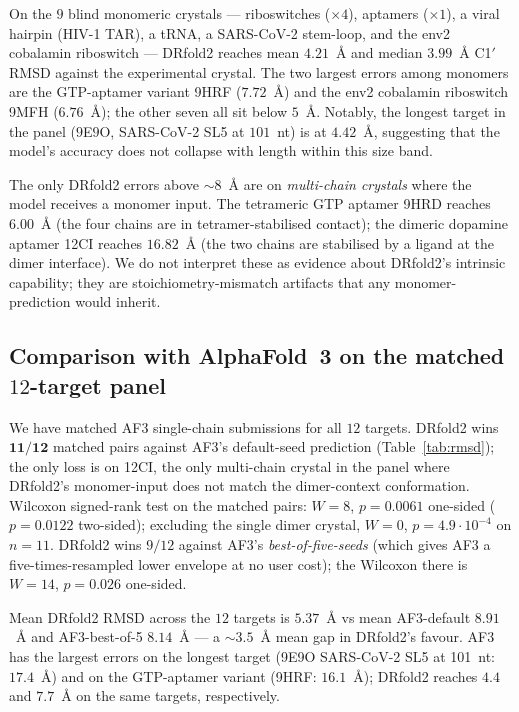 \documentclass[11pt,a4paper]{article}
\begin{document}
On the $9$ blind monomeric crystals --- riboswitches ($\times 4$),
aptamers ($\times 1$), a viral hairpin (HIV-1 TAR), a tRNA, a
SARS-CoV-2 stem-loop, and the env2 cobalamin riboswitch ---
DRfold2 reaches mean $4.21$~\AA{} and median $3.99$~\AA{} C1$'$ RMSD
against the experimental crystal. The two largest errors among
monomers are the GTP-aptamer variant 9HRF ($7.72$~\AA{}) and the
env2 cobalamin riboswitch 9MFH ($6.76$~\AA{}); the other seven all
sit below $5$~\AA{}. Notably, the longest target in the panel
($9$E$9$O, SARS-CoV-2 SL5 at $101$~nt) is at $4.42$~\AA{}, suggesting
that the model's accuracy does not collapse with length within
this size band.

The only DRfold2 errors above $\sim 8$~\AA{} are on \emph{multi-chain
crystals} where the model receives a monomer input. The tetrameric
GTP aptamer 9HRD reaches $6.00$~\AA{} (the four chains are in
tetramer-stabilised contact); the dimeric dopamine aptamer 12CI
reaches $16.82$~\AA{} (the two chains are stabilised by a ligand at
the dimer interface). We do not interpret these as evidence about
DRfold2's intrinsic capability; they are stoichiometry-mismatch
artifacts that any monomer-prediction would inherit.

\subsection{Comparison with AlphaFold~3 on the matched $12$-target panel}

We have matched AF3 single-chain submissions for all $12$ targets.
DRfold2 wins $\mathbf{11/12}$ matched pairs against AF3's
default-seed prediction (Table~\ref{tab:rmsd}); the only loss is on
12CI, the only multi-chain crystal in the panel where DRfold2's
monomer-input does not match the dimer-context conformation.
Wilcoxon signed-rank test on the matched pairs:
$W=8$, $p=0.0061$ one-sided ($p=0.0122$ two-sided); excluding the
single dimer crystal, $W=0$, $p=4.9\!\cdot\!10^{-4}$ on $n=11$.
DRfold2 wins $9/12$ against AF3's \emph{best-of-five-seeds} (which
gives AF3 a five-times-resampled lower envelope at no user cost);
the Wilcoxon there is $W=14$, $p=0.026$ one-sided.

Mean DRfold2 RMSD across the $12$ targets is $5.37$~\AA{} vs mean
AF3-default $8.91$~\AA{} and AF3-best-of-5 $8.14$~\AA{} --- a
$\sim$$3.5$~\AA{} mean gap in DRfold2's favour. AF3 has the largest
errors on the longest target (9E9O SARS-CoV-2 SL5 at 101~nt:
$17.4$~\AA{}) and on the GTP-aptamer variant (9HRF: $16.1$~\AA{});
DRfold2 reaches $4.4$ and $7.7$~\AA{} on the same targets,
respectively.
\end{document}
